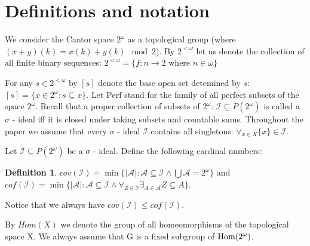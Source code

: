 \documentclass[b5cutpaper, twoside, 11pt, leqno]{moravica}
\newcommand{\calA}{\mathcal{A}}
\newcommand{\calI}{\mathcal{I}}
\newcommand{\ca}{2^{\omega}}
\newcommand{\oo}{\omega}
\newcommand{\real}{\bf R}
\newcommand{\cof}{\mathit{cof}}
\newcommand{\cov}{\mathit{cov}}
\newcommand{\cantor}{\ca}
\newcommand{\Perf}{\mathrm{Perf}}
\newcommand\Hom{{\rm Hom(\ca)}}
\theoremstyle{definition}
\newtheorem{definition}{Definition}[section]
\begin{document}


\section{Definitions and notation} 

We consider the Cantor space $2^\omega$ 
as a topological group (where 
$(x+y)(k) = x(k) + y(k)\mod 2$).
By $2^{<\omega}$ let us denote the collection of all finite binary sequences:
$2^{<\omega} = \lbrace f\colon n \to 2 \text{ where } n \in\omega\rbrace$

  For any $s\in 2^{<\omega}$ 
by $[s]$ denote the base open set detemined by $s$: 
$[s] = \{x\in\cantor\colon s \subseteq x\}$.
  Let $\Perf$ stand for the family of all perfect subsets of the space
$2^\omega$.
  Recall that a proper collection of subsets of $\cantor$: 
$\calI \subseteq P(\cantor)$ is called a $\sigma$ - ideal 
iff it is closed under taking subsets and countable sums.
  Throughout the paper we assume that every $\sigma$ - ideal
$\calI$ contains all singletons:
$\forall_{x\in X} \lbrace x \rbrace \in \calI$.


  Let $\calI \subseteq P(\cantor)$ be a $\sigma$ - ideal.
Define the following cardinal numbers:

\begin{definition}
$\cov(\calI) = \min \lbrace |\calA| \colon \calA \subseteq \calI \wedge
\bigcup \calA = \cantor\rbrace$ and
$\cof(\calI) = \min \lbrace |\calA| \colon \calA \subseteq \calI \wedge
\forall_{Z \in \calI} \exists_{A\in\calA} Z \subseteq A\rbrace$.
\end{definition}

  Notice that we always have $\cov(\calI) \leq \cof(\calI)$.

  By $Hom(X)$ we denote the group of all homeomorphisms of the
topological space X.
  We always assume that G is a fixed subgroup of $\Hom$.
\end{document}
